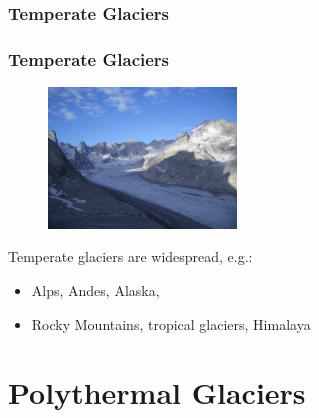 \documentclass[hide notes,intlimits]{beamer}
\begin{document}
\subsubsection{Temperate Glaciers}

\begin{frame}
  \frametitle{Temperate Glaciers}
  \begin{figure}
    \includegraphics[width=5cm]{figures/forno}
  \end{figure}
  Temperate glaciers are widespread, e.g.:
  \begin{itemize}
  \item Alps, Andes, Alaska,
  \item Rocky Mountains, tropical glaciers, Himalaya
  \end{itemize}
\end{frame}


\section{Polythermal Glaciers}


\end{document}
